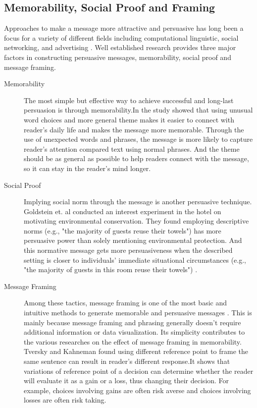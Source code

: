 \subsection{Memorability, Social Proof and Framing}
Approaches to make a message more attractive and persuasive has long been a focus for a variety of different fields including computational linguistic, social networking, and advertising \cite{smith1996message,tversky1981framing,danescu2012you,huntertowards,maheswaran1990influence,grewal1994moderating}. Well established research provides three major factors in constructing persuasive messages, memorability, social proof and message framing.

\begin{description}
\item[Memorability]
The most simple but effective way to achieve successful and long-last persuasion is through memorability.In \cite{danescu2012you} the study showed that using unusual word choices and more general theme makes it easier to connect with reader's daily life and makes the message more memorable. Through the use of unexpected words and phrases, the message is more likely to capture reader's attention compared text using normal phrases. And the theme should be as general as possible to help readers connect with the message, so it can stay in the reader's mind longer.

\item[Social Proof]
Implying social norm through the message is another persuasive technique.  Goldstein et. al conducted an interest experiment in the hotel on motivating environmental conservation. They found employing descriptive norms (e.g., "the majority of guests reuse their towels") has more persuasive power than solely mentioning environmental protection. And this normative message gets more persuasiveness when the described setting is closer to individuals' immediate situational circumstances (e.g., "the majority of guests in this room reuse their towels") \cite{goldstein2008room}.

\item[Message Framing]
Among these tactics, message framing is one of the most basic and intuitive methods to generate memorable and persuasive messages \cite{smith1996message,tversky1981framing}. This is mainly because message framing and phrasing generally doesn't require additional information or data visualization. Its simplicity contributes to the various researches on the effect of message framing in memorability. Tversky and Kahneman found using different reference point to frame the same sentence can result in reader's different response\cite{tversky1992advances,tversky1981framing,kahneman1984choices}.It shows that variations of reference point of a decision can determine whether the reader will evaluate it as a gain or a loss, thus changing their decision. For example, choices involving gains are often risk averse and choices involving losses are often risk taking.

\end{description}
